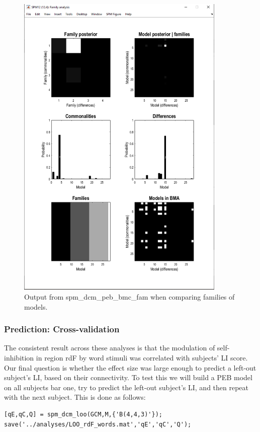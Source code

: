 \documentclass{article}
\begin{document}
\begin{figure}[ht]
\begin{center}
\includegraphics[width=10cm]{"Fig_peb_family_analysis"}
\caption{Output from spm\_dcm\_peb\_bmc\_fam when comparing families of models.\label{Fig_peb_family_analysis}}
\end{center}
\end{figure}

\subsubsection{Prediction: Cross-validation}
The consistent result across these analyses is that the modulation of self-inhibition in region rdF by word stimuli was correlated with subjects' LI score. Our final question is whether the effect size was large enough to predict a left-out subject's LI, based on their connectivity. To test this we will build a PEB model on all subjects bar one, try to predict the left-out subject's LI, and then repeat with the next subject. This is done as follows:

\begin{lstlisting}[style=Matlab-editor,caption=Cross-validation]
[qE,qC,Q] = spm_dcm_loo(GCM,M,{'B(4,4,3)'});
save('../analyses/LOO_rdF_words.mat','qE','qC','Q');
\end{lstlisting}
\end{document}
